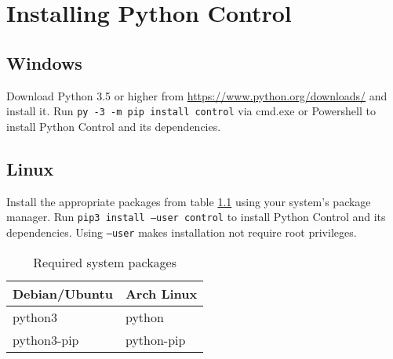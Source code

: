 \chapter{Installing Python Control} \label{ch:app-installing-python-control}

\section{Windows}

Download Python 3.5 or higher from \url{https://www.python.org/downloads/} and
install it. Run \texttt{py -3 -m pip install control} via cmd.exe or Powershell
to install Python Control and its dependencies.

\section{Linux}

Install the appropriate packages from table \ref{tab:required_system_packages}
using your system's package manager. Run \texttt{pip3 install --user control} to
install Python Control and its dependencies. Using \texttt{--user} makes
installation not require root privileges.

\begin{table}
  \renewcommand{\arraystretch}{1.5}
  \centering
  \begin{tabular}{|ll|}
    \hline
    \rowcolor{headingbg}
    \textbf{Debian/Ubuntu} & \textbf{Arch Linux} \\
    \hline
    python3 & python \\
    python3-pip & python-pip \\
    \hline
  \end{tabular}
  \caption{Required system packages}
  \label{tab:required_system_packages}
\end{table}
